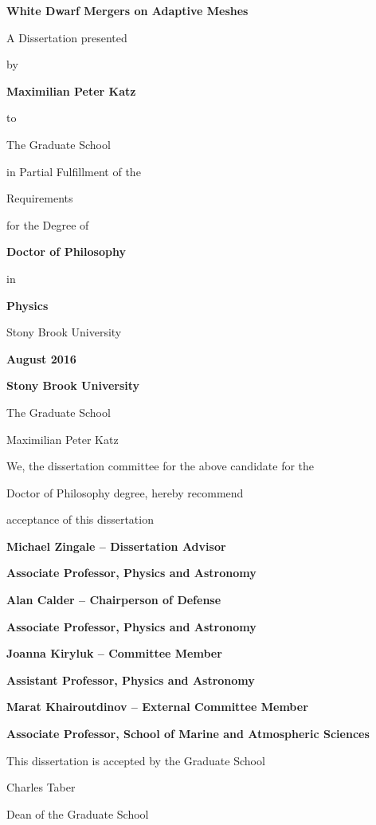 \documentclass[12pt]{article}
\begin{document}
\vspace*{3\baselineskip}
\centerline{\bf{White Dwarf Mergers on Adaptive Meshes}}
\vspace*{1\baselineskip}
\centerline{A Dissertation presented}
\vspace*{1\baselineskip}
\centerline{by} 
\vspace*{1\baselineskip}
\centerline{\bf{Maximilian Peter Katz}}
\vspace*{1\baselineskip}
\centerline{to} 
\vspace*{1\baselineskip}
\centerline{The Graduate School}
\vspace*{1\baselineskip}
\centerline{in Partial Fulfillment of the}
\vspace*{1\baselineskip}
\centerline{Requirements}
\vspace*{1\baselineskip}
\centerline{for the Degree of}
\vspace*{1\baselineskip}
\centerline{\bf{Doctor of Philosophy}}
\vspace*{1\baselineskip}
\centerline{in}
\vspace*{1\baselineskip}
\centerline{\bf{Physics}}
\vspace*{2\baselineskip}
\centerline{Stony Brook University}
\vspace*{2\baselineskip}
\centerline{\bf{August 2016}}     

\newpage
{}
\setcounter{page}{2}

\centerline{\bf{Stony Brook University}}
\vspace*{1\baselineskip}
\centerline{The Graduate School}
\vspace*{2\baselineskip}
\centerline{Maximilian Peter Katz}
\vspace*{2\baselineskip}
\centerline{We, the dissertation committee for the above candidate for the}
\vspace*{1\baselineskip}
\centerline{Doctor of Philosophy degree, hereby recommend}
\vspace*{1\baselineskip}
\centerline{acceptance of this dissertation}
\vspace*{2\baselineskip}
\centerline{\bf{Michael Zingale -- Dissertation Advisor}}
\centerline{\bf{Associate Professor, Physics and Astronomy}}
\vspace*{2\baselineskip}
\centerline{\bf{Alan Calder -- Chairperson of Defense}}
\centerline{\bf{Associate Professor, Physics and Astronomy}}
\vspace*{2\baselineskip}
\centerline{\bf{Joanna Kiryluk -- Committee Member}}
\centerline{\bf{Assistant Professor, Physics and Astronomy}} 
\vspace*{2\baselineskip}
\centerline{\bf{Marat Khairoutdinov -- External Committee Member}}
\centerline{\bf{Associate Professor, School of Marine and Atmospheric Sciences}}
\vspace*{2\baselineskip}
\centerline{This dissertation is accepted by the Graduate School}
\vspace*{3\baselineskip}
\centerline{Charles Taber}
\centerline{Dean of the Graduate School}
\end{document}
